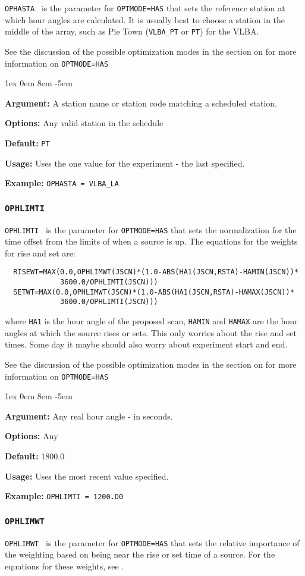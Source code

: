 \documentclass{report}
\newcommand{\rcwbox}[5]{
  \begin{list}{}{\parsep 1ex  \itemsep 0em
                 \leftmargin 8em  \itemindent -5em }
    \item {\bf Argument:} #1
    \item {\bf Options:}  #2
    \item {\bf Default:}  #3
    \item {\bf Usage:}    #4
    \item {\bf Example:}  #5
  \end{list}
}
\begin{document}
{\tt OPHASTA } is the parameter for {\tt OPTMODE=HAS} that sets the
reference station at which hour angles are calculated.  It is usually
best to choose a station in the middle of the array, such as Pie Town
({\tt VLBA\_PT} or {\tt PT}) for the VLBA.

See the discussion of the possible optimization modes in the section
on  for more information on
{\tt OPTMODE=HAS}

\rcwbox
{A station name or station code matching a scheduled station.}
{Any valid station in the schedule}
{{\tt PT}}
{Uses the one value for the experiment - the last specified.}
{{\tt OPHASTA = VLBA\_LA}}

\subsubsection{\label{MP:OPHLIMTI}{\tt OPHLIMTI}}

{\tt OPHLIMTI } is the parameter for {\tt OPTMODE=HAS} that sets the
normalization for the time offset from the limits of when a source
is up.   The equations for the weights for rise and set are:
\begin{verbatim}
  RISEWT=MAX(0.0,OPHLIMWT(JSCN)*(1.0-ABS(HA1(JSCN,RSTA)-HAMIN(JSCN))*
             3600.0/OPHLIMTI(JSCN)))
  SETWT=MAX(0.0,OPHLIMWT(JSCN)*(1.0-ABS(HA1(JSCN,RSTA)-HAMAX(JSCN))*
             3600.0/OPHLIMTI(JSCN)))
\end{verbatim}
where {\tt HA1} is the hour angle of the proposed scan, {\tt HAMIN}
and {\tt HAMAX} are the hour angles at which the source rises or
sets.  This only worries about the rise and set times.  Some day
it maybe should also worry about experiment start and end.

See the discussion of the possible optimization modes in the section
on  for more information on
{\tt OPTMODE=HAS}

\rcwbox
{Any real hour angle - in seconds.}
{Any}
{1800.0}
{Uses the most recent value specified.}
{{\tt OPHLIMTI = 1200.D0}}

\subsubsection{\label{MP:OPHLIMWT}{\tt OPHLIMWT}}

{\tt OPHLIMWT } is the parameter for {\tt OPTMODE=HAS} that sets the
relative importance of the weighting based on being near the
rise or set time of a source.  For the equations
for these weights, see .
\end{document}
